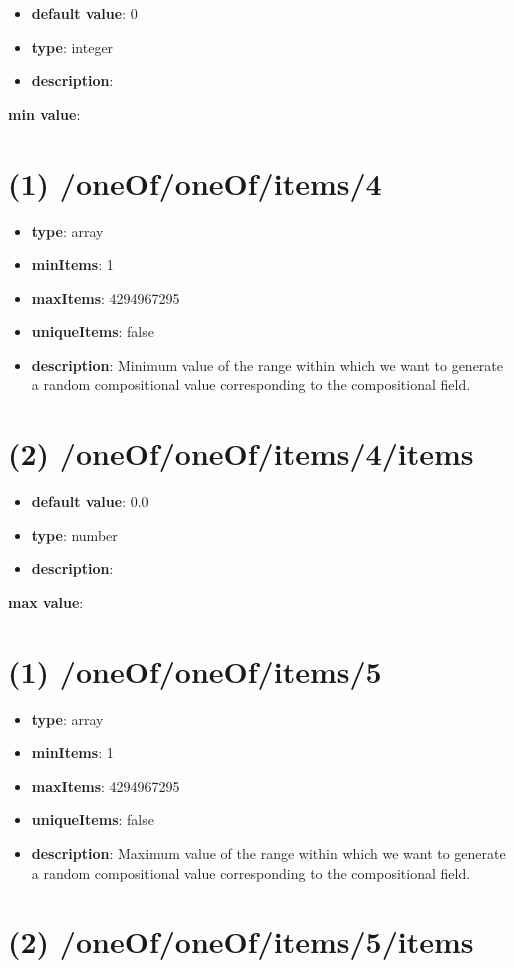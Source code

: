 \begin{itemize}[leftmargin=2em]\item {\bf default value}: 0
\item {\bf type}: integer
\item {\bf description}: 
\end{itemize}\item {\bf min value}: \section{(1) /oneOf/oneOf/items/4}
\begin{itemize}[leftmargin=1em]\item {\bf type}: array
\item {\bf minItems}: 1
\item {\bf maxItems}: 4294967295
\item {\bf uniqueItems}: false
\item {\bf description}: Minimum value of the range within which we want to generate a random compositional value corresponding to the compositional field.
\end{itemize}\section{(2) /oneOf/oneOf/items/4/items}
\begin{itemize}[leftmargin=2em]\item {\bf default value}: 0.0
\item {\bf type}: number
\item {\bf description}: 
\end{itemize}\item {\bf max value}: \section{(1) /oneOf/oneOf/items/5}
\begin{itemize}[leftmargin=1em]\item {\bf type}: array
\item {\bf minItems}: 1
\item {\bf maxItems}: 4294967295
\item {\bf uniqueItems}: false
\item {\bf description}: Maximum value of the range within which we want to generate a random compositional value corresponding to the compositional field.
\end{itemize}\section{(2) /oneOf/oneOf/items/5/items}
